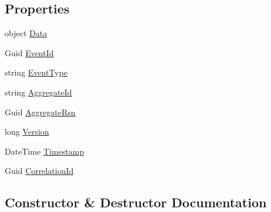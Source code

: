 \subsection*{Properties}
\begin{DoxyCompactItemize}
\item 
object \hyperlink{classCqrs_1_1Events_1_1EventData_ae001b9d06977e5fd407744459fad2da5}{Data}
\item 
Guid \hyperlink{classCqrs_1_1Events_1_1EventData_a020c856c1e3a97d8783ccf0ba86c6f59}{Event\+Id}
\item 
string \hyperlink{classCqrs_1_1Events_1_1EventData_a11b4f2ea845000dea4148a94d4c6ba93}{Event\+Type}
\item 
string \hyperlink{classCqrs_1_1Events_1_1EventData_a0079e7f2307d3fc54063317edb71ffc2}{Aggregate\+Id}
\item 
Guid \hyperlink{classCqrs_1_1Events_1_1EventData_a562ea218ea8f517a980452097239c774}{Aggregate\+Rsn}
\item 
long \hyperlink{classCqrs_1_1Events_1_1EventData_a6abb7d888f3bba44c081587aacab0181}{Version}
\item 
Date\+Time \hyperlink{classCqrs_1_1Events_1_1EventData_ace1a7435af5c3fd14cfb2dc095d12a85}{Timestamp}
\item 
Guid \hyperlink{classCqrs_1_1Events_1_1EventData_a8d854d86e700a99f7cede8cda598d271}{Correlation\+Id}
\end{DoxyCompactItemize}


\subsection{Constructor \& Destructor Documentation}
\mbox{\label{classCqrs_1_1Events_1_1EventData_a0387ea22e5cdc085caf113a82f5ace18}} 
